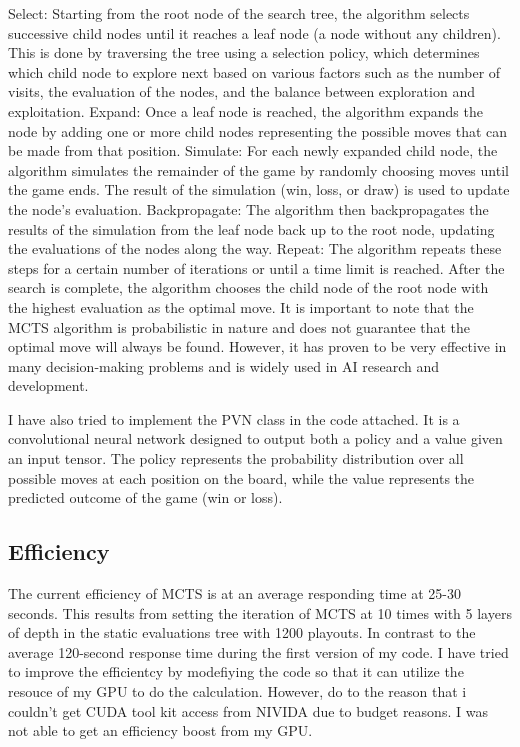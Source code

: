\documentclass[10pt,twocolumn]{article}
\begin{document}
    Select: Starting from the root node of the search tree, the algorithm selects successive child nodes until it reaches a leaf node (a node without any children). This is done by traversing the tree using a selection policy, which determines which child node to explore next based on various factors such as the number of visits, the evaluation of the nodes, and the balance between exploration and exploitation.
    Expand: Once a leaf node is reached, the algorithm expands the node by adding one or more child nodes representing the possible moves that can be made from that position.
    Simulate: For each newly expanded child node, the algorithm simulates the remainder of the game by randomly choosing moves until the game ends. The result of the simulation (win, loss, or draw) is used to update the node's evaluation.
    Backpropagate: The algorithm then backpropagates the results of the simulation from the leaf node back up to the root node, updating the evaluations of the nodes along the way.
    Repeat: The algorithm repeats these steps for a certain number of iterations or until a time limit is reached. After the search is complete, the algorithm chooses the child node of the root node with the highest evaluation as the optimal move.
    It is important to note that the MCTS algorithm is probabilistic in nature and does not guarantee that the optimal move will always be found. However, it has proven to be very effective in many decision-making problems and is widely used in AI research and development.

    I have also tried to implement the PVN class in the code attached. It is a convolutional neural network designed to output both a policy and a value given an input tensor. The policy represents the probability distribution over all possible moves at each position on the board, while the value represents the predicted outcome of the game (win or loss).

    
\subsection{Efficiency}
    The current efficiency of MCTS is at an average responding time at 25-30 seconds. This results from setting the iteration of MCTS at 10 times with 5 layers of depth in the static evaluations tree with 1200 playouts. 
    In contrast to the average 120-second response time during the first version of my code. I have tried to improve the efficientcy by modefiying the code so that it can utilize the resouce of my GPU to do the calculation. However, do to the reason that i couldn't get CUDA tool kit access from NIVIDA due to budget reasons. I was not able to get an efficiency boost from my GPU. 
    
\end{document}
